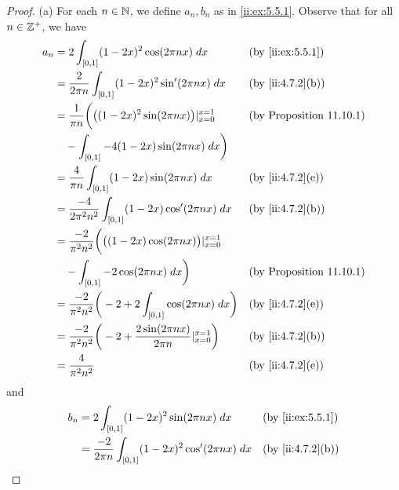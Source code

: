 \begin{proof}{(a)}
  For each \(n \in \mathbb{N}\), we define \(a_n, b_n\) as in \cref{ii:ex:5.5.1}.
  Observe that for all \(n \in \mathbb{Z}^+\), we have
  \begin{align*}
    a_n & = 2 \int_{[0, 1]} (1 - 2x)^2 \cos(2 \pi n x) \; dx                                           &  & \by{ii:ex:5.5.1}                \\
        & = \dfrac{2}{2 \pi n} \int_{[0, 1]} (1 - 2x)^2 \sin'(2 \pi n x) \; dx                         &  & \by{ii:4.7.2}[b]                \\
        & = \dfrac{1}{\pi n} \bigg(\big((1 - 2x)^2 \sin(2 \pi n x)\big)|_{x = 0}^{x = 1}               &  & \text{(by Proposition 11.10.1)} \\
        & \quad - \int_{[0, 1]} -4 (1 - 2x) \sin(2 \pi n x) \; dx\bigg)                                                                     \\
        & = \dfrac{4}{\pi n} \int_{[0, 1]} (1 - 2x) \sin(2 \pi n x) \; dx                              &  & \by{ii:4.7.2}[e]                \\
        & = \dfrac{-4}{2 \pi^2 n^2} \int_{[0, 1]} (1 - 2x) \cos'(2 \pi n x) \; dx                      &  & \by{ii:4.7.2}[b]                \\
        & = \dfrac{-2}{\pi^2 n^2} \bigg(\big((1 - 2x) \cos(2 \pi n x)\big)|_{x = 0}^{x = 1}                                                 \\
        & \quad - \int_{[0, 1]} -2 \cos(2 \pi n x) \; dx\bigg)                                         &  & \text{(by Proposition 11.10.1)} \\
        & = \dfrac{-2}{\pi^2 n^2} \bigg(-2 + 2 \int_{[0, 1]} \cos(2 \pi n x) \; dx\bigg)               &  & \by{ii:4.7.2}[e]                \\
        & = \dfrac{-2}{\pi^2 n^2} \bigg(-2 + \dfrac{2 \sin(2 \pi n x)}{2 \pi n}|_{x = 0}^{x = 1}\bigg) &  & \by{ii:4.7.2}[b]                \\
        & = \dfrac{4}{\pi^2 n^2}                                                                       &  & \by{ii:4.7.2}[e]
  \end{align*}
  and
  \begin{align*}
    b_n & = 2 \int_{[0, 1]} (1 - 2x)^2 \sin(2 \pi n x) \; dx                                &  & \by{ii:ex:5.5.1}                \\
        & = \dfrac{-2}{2 \pi n} \int_{[0, 1]} (1 - 2x)^2 \cos'(2 \pi n x) \; dx             &  & \by{ii:4.7.2}[b]                \\

\end{align*}
\end{proof}
